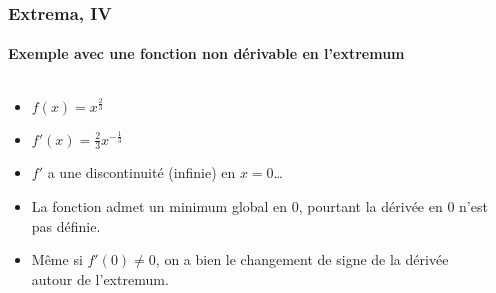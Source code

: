 \documentclass[10pt,notheorems]{beamer}
\theoremstyle{plain}
\theoremstyle{definition} %
\begin{document}
\begin{frame}
  \frametitle{Extrema, IV}
  \framesubtitle{Exemple avec une fonction non dérivable en l'extremum}

  \begin{columns}[onlytextwidth]
    \begin{column}{.5\textwidth}
      \begin{itemize}

      \item $f(x) = x^{\frac{2}{3}}$\newline

      \item $f'(x) = \frac{2}{3}x^{-\frac{1}{3}}$\newline

      \item $f'$ a une discontinuité (infinie) en $x=0$\ldots\newline

      \item La fonction admet un minimum global en 0, pourtant la dérivée
        en 0 n'est pas définie.\newline

      \item Même si $f'(0) \neq 0$, on a bien le changement de signe
        de la dérivée autour de l'extremum.
      \end{itemize}
    \end{column}
    \begin{column}{.5\textwidth}
      \begin{center}
      \end{center}
    \end{column}
  \end{columns}

\end{frame}
\end{document}
